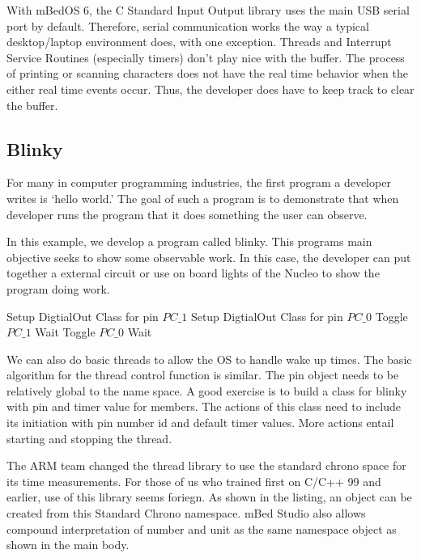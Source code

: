 \documentclass{article}
\begin{document}
With mBedOS 6, the C Standard Input Output library uses the main USB serial port by default.  Therefore, serial communication works the way a typical desktop/laptop environment does, with one exception.  Threads and Interrupt Service Routines (especially timers) don't play nice with the buffer.  The process of printing or scanning characters does not have the real time behavior when the either real time events occur.  Thus, the developer does have to keep track to clear the buffer.



\subsection{Blinky} %
\label{sub:blinky}

For many in computer programming industries, the first program a developer writes is `hello world.'  The goal of such a program is to demonstrate that when developer runs the program that it does something the user can observe.  

In this example, we develop a program called blinky.  This programs main objective seeks to show some observable work.  In this case, the developer can put together a external circuit or use on board lights of the Nucleo to show the program doing work.  

\begin{algorithmic}
	\STATE Setup DigtialOut Class for pin $PC\_1$
	\STATE Setup DigtialOut Class for pin $PC\_0$ 
		\STATE Toggle $PC\_1$
		\STATE Wait 
		\STATE Toggle $PC\_0$
		\STATE Wait
	\ENDWHILE
\end{algorithmic}

We can also do basic threads to allow the OS to handle wake up times.  The basic algorithm for the thread control function is similar.  The pin object needs to be relatively global to the name space.  A good exercise is to build a class for blinky with pin and timer value for members.  The actions of this class need to include its initiation with pin number id and default timer values.  More actions entail starting and stopping the thread.  

The ARM team changed the thread library to use the standard chrono space for its time measurements.  For those of us who trained first on C/C++ 99 and earlier, use of this library seems foriegn.  As shown in the listing, an object can be created from this Standard Chrono namespace.  mBed Studio also allows compound interpretation of number and unit as the same namespace object as shown in the main body.
\end{document}
